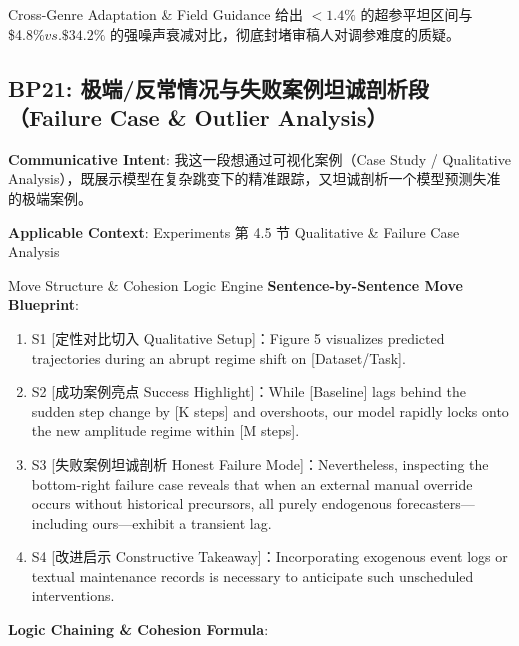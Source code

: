 \endgroup
\vspace{4pt}
\begin{TipBox}{Cross-Genre Adaptation \& Field Guidance}
给出 $<1.4\%$ 的超参平坦区间与 \$4.8\%$ vs. \$34.2\%$ 的强噪声衰减对比，彻底封堵审稿人对调参难度的质疑。
\end{TipBox}
\vspace{8pt}
\subsection{BP21: 极端/反常情况与失败案例坦诚剖析段（Failure Case \& Outlier Analysis）}\label{sec:bp:BP21}
\noindent\textbf{\color{AcadNavy}Communicative Intent}: 我这一段想通过可视化案例（Case Study / Qualitative Analysis），既展示模型在复杂跳变下的精准跟踪，又坦诚剖析一个模型预测失准的极端案例。\par\vspace{2pt}
\noindent\textbf{\color{AcadSlate}Applicable Context}: Experiments 第 4.5 节 Qualitative \& Failure Case Analysis\par\vspace{4pt}
\begin{ConceptBox}{Move Structure \& Cohesion Logic Engine}
\textbf{Sentence-by-Sentence Move Blueprint}:
\begin{enumerate}[label=\textbf{\color{AcadNavy}S\arabic*.}, leftmargin=2em, itemsep=2pt]
  \item S1 [定性对比切入 Qualitative Setup]：Figure 5 visualizes predicted trajectories during an abrupt regime shift on [Dataset/Task].
  \item S2 [成功案例亮点 Success Highlight]：While [Baseline] lags behind the sudden step change by [K steps] and overshoots, our model rapidly locks onto the new amplitude regime within [M steps].
  \item S3 [失败案例坦诚剖析 Honest Failure Mode]：Nevertheless, inspecting the bottom-right failure case reveals that when an external manual override occurs without historical precursors, all purely endogenous forecasters---including ours---exhibit a transient lag.
  \item S4 [改进启示 Constructive Takeaway]：Incorporating exogenous event logs or textual maintenance records is necessary to anticipate such unscheduled interventions.
\end{enumerate}\par\vspace{4pt}
\textbf{Logic Chaining \& Cohesion Formula}:\par{}
\end{ConceptBox}
